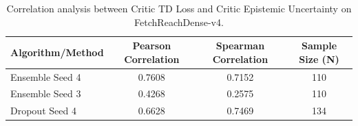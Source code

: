\begin{table}
\caption{Correlation analysis between Critic TD Loss and Critic Epistemic Uncertainty on FetchReachDense-v4.}
\label{tab:critic_corr_FetchReachDense-v4}
\begin{tabular}{lccc}
\toprule
Algorithm/Method & Pearson Correlation & Spearman Correlation & Sample Size (N) \\
\midrule
Ensemble Seed 4 & 0.7608 & 0.7152 & 110 \\
Ensemble Seed 3 & 0.4268 & 0.2575 & 110 \\
Dropout Seed 4 & 0.6628 & 0.7469 & 134 \\
\bottomrule
\end{tabular}
\end{table}
